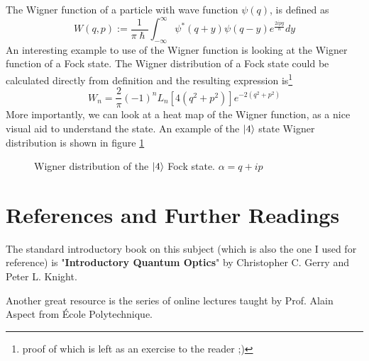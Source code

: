The Wigner function of a particle with wave function $\psi (q)$, is defined as 
\[
    W (q, p) := \frac{1}{\pi \hslash} \int_{-\infty}^\infty \psi^* (q + y) \psi (q - y) e^{\frac{2ipy}{\hslash}} dy
\]
An interesting example to use of the Wigner function is looking at the Wigner function of a Fock state. The Wigner distribution of a Fock state could be calculated directly from definition and the resulting expression is\footnote{proof of which is left as an exercise to the reader ;)}
\[
    W_n = \frac{2}{\pi} (-1)^n L_n[4 (q^2 + p^2)]e^{-2 (q^2 + p^2)}
\]
More importantly, we can look at a heat map of the Wigner function, as a nice visual aid to understand the state. An example of the $\ket{4}$ state Wigner distribution is shown in figure \ref{fig:Fock-State-Wigner}

\begin{figure}[H]
    \begin{center}
        
    \end{center}
    \caption{Wigner distribution of the $\ket{4}$ Fock state. $\alpha = q + ip$}
    \label{fig:Fock-State-Wigner}
\end{figure}

\section{References and Further Readings}
The standard introductory book on this subject (which is also the one I used for reference) is "\textbf{Introductory Quantum Optics}" by Christopher C. Gerry and Peter L. Knight.

Another great resource is the series of online lectures taught by Prof. Alain Aspect from École Polytechnique.